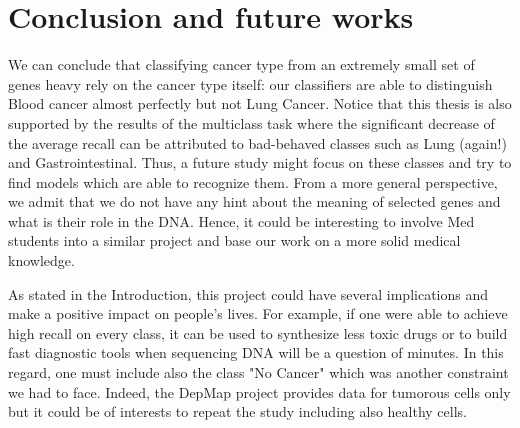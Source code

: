 \documentclass[a4paper,11pt, oneside]{article}  %
\begin{document}
\section{Conclusion and future works}
We can conclude that classifying cancer type from an extremely small set of genes heavy rely on the cancer type itself: our classifiers are able to distinguish Blood cancer almost perfectly but not Lung Cancer.  Notice that this thesis is also supported by the results of the multiclass task where the significant decrease of the average recall can be attributed to bad-behaved classes such as Lung (again!) and Gastrointestinal.  Thus,  a future study might focus on these classes and try to find models which are able to recognize them.  From a more general perspective,  we admit that we do not have any hint about the meaning of selected genes and what is their role in the DNA.  Hence, it could be interesting to involve Med students into a similar project and base our work on a more solid medical knowledge.   

As stated in the Introduction,  this project could have several implications and make a positive impact on people's lives.  For example,  if one were able to achieve high recall on every class,  it can be used to synthesize less toxic drugs or to build fast diagnostic tools when sequencing DNA will be a question of minutes.  In this regard,  one must include also the class "No Cancer" which was another constraint we had to face.  Indeed,  the DepMap project provides data for tumorous cells only but it could be of interests to repeat the study including also healthy cells.  
\end{document}
